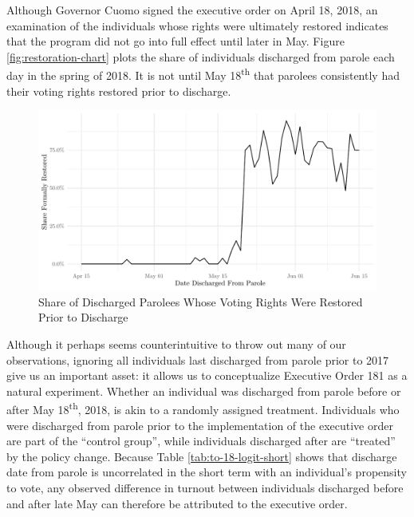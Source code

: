 \documentclass[12pt,]{article}
\begin{document}
Although Governor Cuomo signed the executive order on April 18, 2018, an examination of the individuals whose rights were ultimately restored indicates that the program did not go into full effect until later in May. Figure \ref{fig:restoration-chart} plots the share of individuals discharged from parole each day in the spring of 2018. It is not until May 18\textsuperscript{th} that parolees consistently had their voting rights restored prior to discharge.

\begin{figure}[H]

{\centering \includegraphics{felony_disenfranchisement_nys_files/figure-latex/restoration-chart-chunk-1} 

}

\caption{\label{fig:restoration-chart}Share of Discharged Parolees Whose Voting Rights Were Restored Prior to Discharge}\label{fig:restoration-chart-chunk}
\end{figure}

Although it perhaps seems counterintuitive to throw out many of our observations, ignoring all individuals last discharged from parole prior to 2017 give us an important asset: it allows us to conceptualize Executive Order 181 as a natural experiment. Whether an individual was discharged from parole before or after May 18\textsuperscript{th}, 2018, is akin to a randomly assigned treatment. Individuals who were discharged from parole prior to the implementation of the executive order are part of the ``control group'', while individuals discharged after are ``treated'' by the policy change. Because Table \ref{tab:to-18-logit-short} shows that discharge date from parole is uncorrelated in the short term with an individual's propensity to vote, any observed difference in turnout between individuals discharged before and after late May can therefore be attributed to the executive order.
\end{document}
